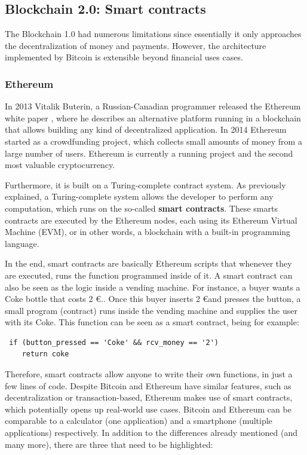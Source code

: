 \subsection{Blockchain 2.0: Smart contracts}

The Blockchain 1.0 had numerous limitations since essentially it only approaches the decentralization of money and payments. However, the architecture implemented by Bitcoin is extensible beyond financial uses cases.

\subsubsection{Ethereum}

In 2013 Vitalik Buterin, a Russian-Canadian programmer released the Ethereum white paper \cite{buterin2014next}, where he describes an alternative platform running in a blockchain that allows building any kind of decentralized application. In 2014 Ethereum started as a crowdfunding project, which collects small amounts of money from a large number of users.  Ethereum is currently a running project and the second most valuable cryptocurrency.

Furthermore, it is built on a Turing-complete contract system. As previously explained, a Turing-complete system allows the developer to perform any computation, which runs on the so-called \textbf{smart contracts}. These smarts contracts are executed by the Ethereum nodes, each using its Ethereum Virtual Machine (EVM), or in other words, a blockchain with a built-in programming language.

In the end, smart contracts are basically Ethereum scripts that whenever they are executed, runs the function programmed inside of it. A smart contract can also be seen as the logic inside a vending machine. For instance, a buyer wants a Coke bottle that costs 2 \euro.. Once this buyer inserts 2 \euro and presses the button, a small program (contract) runs inside the vending machine and supplies the user with its Coke. This function can be seen as a smart contract, being for example:

\begin{lstlisting}
 if (button_pressed == 'Coke' && rcv_money == '2')
 	return coke
\end{lstlisting}

Therefore, smart contracts allow anyone to write their own functions, in just a few lines of code. Despite Bitcoin and Ethereum have similar features, such as decentralization or transaction-based, Ethereum makes use of smart contracts, which potentially opens up real-world use cases. Bitcoin and Ethereum can be comparable to a calculator (one application) and a smartphone (multiple applications) respectively. In addition to the differences already mentioned (and many more), there are three that need to be highlighted:

